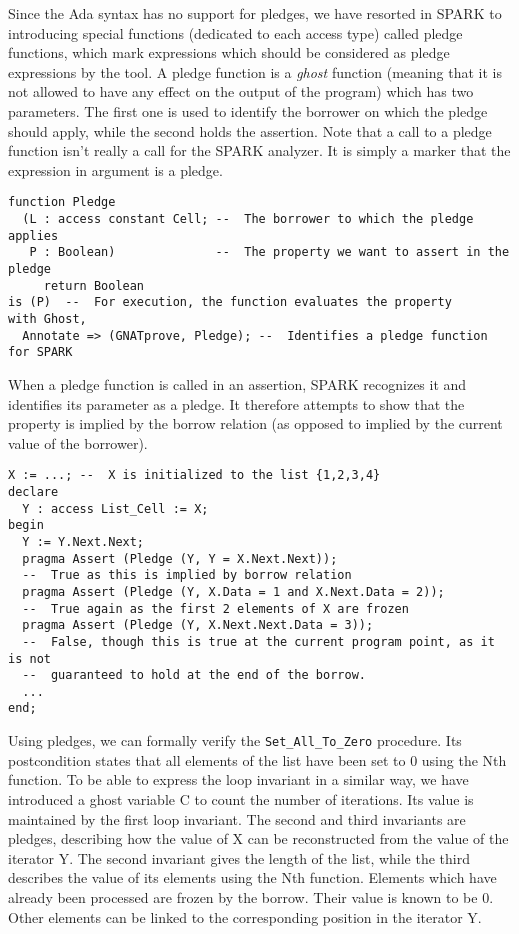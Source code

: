 \documentclass[runningheads]{llncs}
\begin{document}
Since the Ada syntax has no support for pledges, we have resorted in SPARK to introducing special functions (dedicated to each access type) called pledge functions, which mark expressions which should be considered as pledge expressions by the tool. A pledge function is a \emph{ghost} function (meaning that it is not allowed to have any effect on the output of the program) which has two parameters. The first one is used to identify the borrower on which the pledge should apply, while the second holds the assertion.
Note that a call to a pledge function isn't really a call for the SPARK analyzer. It is simply a marker that the expression in argument is a pledge. %
\begin{lstlisting}
function Pledge
  (L : access constant Cell; --  The borrower to which the pledge applies
   P : Boolean)              --  The property we want to assert in the pledge
     return Boolean
is (P)  --  For execution, the function evaluates the property
with Ghost,
  Annotate => (GNATprove, Pledge); --  Identifies a pledge function for SPARK
\end{lstlisting}
When a pledge function is called in an assertion, SPARK recognizes it and identifies its parameter as a pledge. It therefore attempts to show that the property is implied by the borrow relation (as opposed to implied by the current value of the borrower).
\begin{lstlisting}
X := ...; --  X is initialized to the list {1,2,3,4}
declare
  Y : access List_Cell := X;
begin
  Y := Y.Next.Next;
  pragma Assert (Pledge (Y, Y = X.Next.Next));
  --  True as this is implied by borrow relation
  pragma Assert (Pledge (Y, X.Data = 1 and X.Next.Data = 2));
  --  True again as the first 2 elements of X are frozen
  pragma Assert (Pledge (Y, X.Next.Next.Data = 3));
  --  False, though this is true at the current program point, as it is not
  --  guaranteed to hold at the end of the borrow.
  ...
end;
\end{lstlisting}
Using pledges, we can formally verify the \texttt{Set\_All\_To\_Zero} procedure. Its postcondition states that all elements of the list have been set to 0 using the Nth function. To be able to express the loop invariant in a similar way, we have introduced a ghost variable C to count the number of iterations. Its value is maintained by the first loop invariant. The second and third invariants are pledges, describing how the value of X can be reconstructed from the value of the iterator Y. The second invariant gives the length of the list, while the third describes the value of its elements using the Nth function. Elements which have already been processed are frozen by the borrow. Their value is known to be 0. Other elements can be linked to the corresponding position in the iterator Y.
\end{document}
